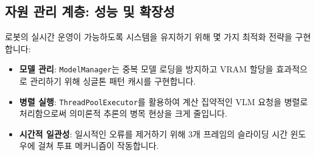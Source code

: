 \subsection{자원 관리 계층: 성능 및 확장성}
로봇의 실시간 운영이 가능하도록 시스템을 유지하기 위해 몇 가지 최적화 전략을 구현합니다:
\begin{itemize}
    \item \textbf{모델 관리}: \texttt{ModelManager}는 중복 모델 로딩을 방지하고 VRAM 할당을 효과적으로 관리하기 위해 싱글톤 패턴 캐시를 구현합니다.
    \item \textbf{병렬 실행}: \texttt{ThreadPoolExecutor}를 활용하여 계산 집약적인 VLM 요청을 병렬로 처리함으로써 의미론적 추론의 병목 현상을 크게 줄입니다.
    \item \textbf{시간적 일관성}: 일시적인 오류를 제거하기 위해 3개 프레임의 슬라이딩 시간 윈도우에 걸쳐 투표 메커니즘이 작동합니다.
\end{itemize}

